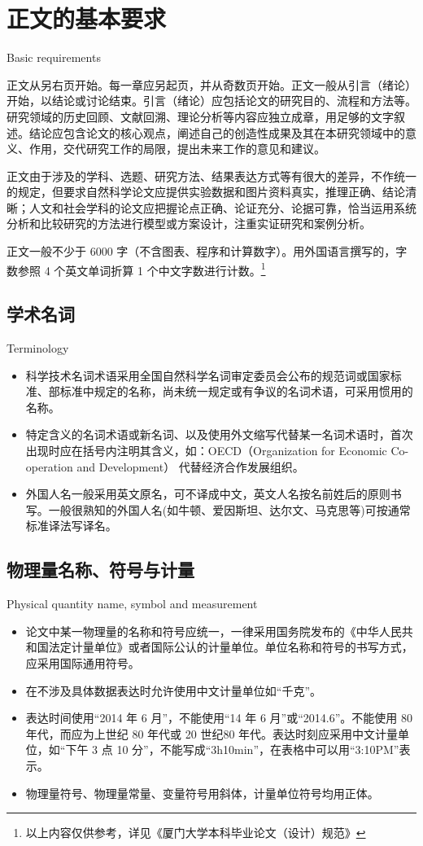 \chapter{正文的基本要求}{Basic requirements}

正文从另右页开始。每一章应另起页，并从奇数页开始。正文一般从引言（绪论）开始，以结论或讨论结束。引言（绪论）应包括论文的研究目的、流程和方法等。研究领域的历史回顾、文献回溯、理论分析等内容应独立成章，用足够的文字叙述。结论应包含论文的核心观点，阐述自己的创造性成果及其在本研究领域中的意义、作用，交代研究工作的局限，提出未来工作的意见和建议。

正文由于涉及的学科、选题、研究方法、结果表达方式等有很大的差异，不作统一的规定，但要求自然科学论文应提供实验数据和图片资料真实，推理正确、结论清晰；人文和社会学科的论文应把握论点正确、论证充分、论据可靠，恰当运用系统分析和比较研究的方法进行模型或方案设计，注重实证研究和案例分析。

正文一般不少于 6000 字（不含图表、程序和计算数字）。用外国语言撰写的，字数参照 4 个英文单词折算 1 个中文字数进行计数。\footnote{以上内容仅供参考，详见《厦门大学本科毕业论文（设计）规范》}


\section{学术名词}{Terminology}

\begin{itemize}
	\item  科学技术名词术语采用全国自然科学名词审定委员会公布的规范词或国家标准、部标准中规定的名称，尚未统一规定或有争议的名词术语，可采用惯用的名称。
	\item 特定含义的名词术语或新名词、以及使用外文缩写代替某一名词术语时，首次出现时应在括号内注明其含义，如：OECD（Organization for Economic Co-operation and Development）
代替经济合作发展组织。
\item  外国人名一般采用英文原名，可不译成中文，英文人名按名前姓后的原则书写。一般很熟知的外国人名(如牛顿、爱因斯坦、达尔文、马克思等)可按通常标准译法写译名。
\end{itemize}



\section{物理量名称、符号与计量}{Physical quantity name, symbol and measurement}


\begin{itemize}
	\item  论文中某一物理量的名称和符号应统一，一律采用国务院发布的《中华人民共和国法定计量单位》或者国际公认的计量单位。单位名称和符号的书写方式，应采用国际通用符号。
	\item 在不涉及具体数据表达时允许使用中文计量单位如“千克”。
	\item 表达时间使用“2014 年 6 月”，不能使用“14 年 6 月”或“2014.6”。不能使用 80 年代，而应为上世纪 80 年代或 20 世纪80 年代。表达时刻应采用中文计量单位，如“下午 3 点 10 分”，不能写成“3h10min”，在表格中可以用“3:10PM”表示。
	\item 物理量符号、物理量常量、变量符号用斜体，计量单位符号均用正体。
\end{itemize}

